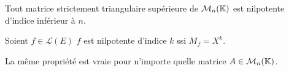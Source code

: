 \begin{prop}
    Tout matrice strictement triangulaire supérieure de $\mathcal{M}_n(\mathbb{K})$ est nilpotente d'indice inférieur à $n$. 
\end{prop}

\begin{prop}
    Soient $f \in \mathcal{L}(E)$ $f$ est nilpotente d'indice $k$ ssi $M_f = X^k$. 

    \vspace{0.3cm}

    La même propriété est vraie pour n'importe quelle matrice $A \in \mathcal{M}_n(\mathbb{K})$. 
\end{prop}




